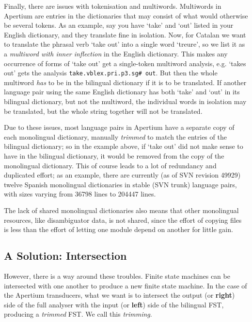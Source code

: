 \documentclass[10pt, a4paper]{article}
\newcommand{\ana}[1]{\texttt{#1}}
\newcommand{\f}[1]{`#1'}
\begin{document}
Finally, there are issues with tokenisation and multiwords.
Multiwords in Apertium are entries in the dictionaries that may
consist of what would otherwise be several tokens. As an example, say
you have \f{take} and \f{out} listed in your English dictionary, and
they translate fine in isolation. Now, for Catalan we want to
translate the phrasal verb \f{take out} into a single word \f{treure},
so we list it as a \emph{multiword with inner inflection} in the
English dictionary. This makes any occurrence of forms of \f{take out}
get a single-token multiword analysis, e.g. \f{takes out} gets the
analysis \ana{take.vblex.pri.p3.sg\# out}. But then the whole multiword
\emph{has} to be in the bilingual dictionary if it is to be
translated. If another language pair using the same English dictionary
has both \f{take} and \f{out} in its bilingual dictionary, but not the
multiword, the individual words in isolation may be translated, but
the whole string together will not be translated.

Due to these issues, most language pairs in Apertium have a separate
copy of each monolingual dictionary, manually \emph{trimmed} to match
the entries of the bilingual dictionary; so in the example above, if
\f{take out} did not make sense to have in the bilingual dictionary,
it would be removed from the copy of the monolingual dictionary. This
of course leads to a lot of redundancy and duplicated effort; as an
example, there are currently (as of SVN revision 49929) twelve Spanish
monolingual dictionaries in stable (SVN trunk) language pairs, with
sizes varying from 36798 lines to 204447 lines.

The lack of shared monolingual dictionaries also means that other
monolingual resources, like disambiguator data, is not shared, since
the effort of copying files is less than the effort of letting one
module depend on another for little gain.

\subsection{A Solution: Intersection}
\label{sec:solution}

However, there is a way around these troubles. Finite state machines
can be intersected with one another to produce a new finite state
machine. In the case of the Apertium transducers, what we want is to
intersect the output (or \textbf{right}) side of the full analyser
with the input (or \textbf{left}) side of the bilingual FST, producing
a \emph{trimmed} FST. We call this \emph{trimming}.
\end{document}
